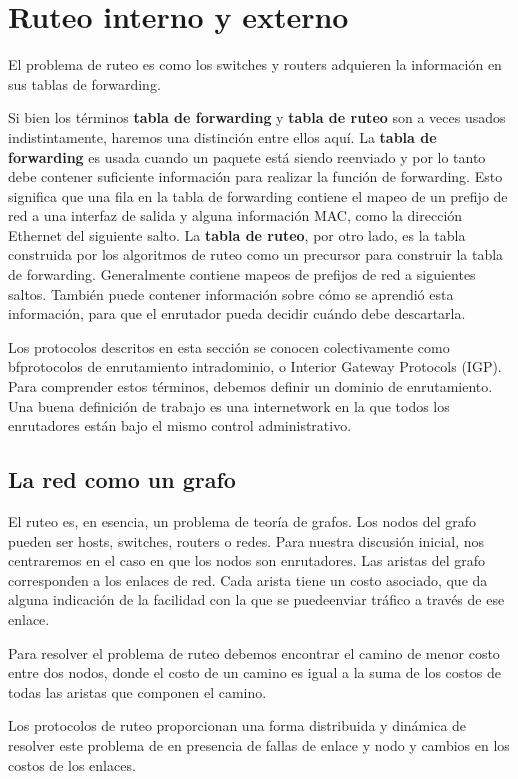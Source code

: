 \section{Ruteo interno y externo}
El problema de ruteo es como los switches y routers adquieren la información en sus tablas de forwarding.

Si bien los términos \textbf{tabla de forwarding} y \textbf{tabla de ruteo} son a veces usados indistintamente, haremos una distinción entre ellos aquí. La \textbf{tabla de forwarding} es usada cuando un paquete está siendo reenviado y por lo tanto debe contener suficiente información para realizar la función de forwarding. Esto significa que una fila en la tabla de forwarding contiene el mapeo de un prefijo de red a una interfaz de salida y alguna información MAC, como la dirección Ethernet del siguiente salto. La \textbf{tabla de ruteo}, por otro lado, es la tabla construida por los algoritmos de ruteo como un precursor para construir la tabla de forwarding. Generalmente contiene mapeos de prefijos de red a siguientes saltos. También puede contener información sobre cómo se aprendió esta información, para que el enrutador pueda decidir cuándo debe descartarla.

Los protocolos descritos en esta sección se conocen colectivamente como \text bf{protocolos de enrutamiento intradominio}, o Interior Gateway Protocols (IGP). Para comprender estos términos, debemos definir un dominio de enrutamiento. Una buena definición de trabajo es una internetwork en la que todos los enrutadores están bajo el mismo control administrativo.

\subsection{La red como un grafo}
El ruteo es, en esencia, un problema de teoría de grafos. Los nodos del grafo pueden ser hosts, switches, routers o redes. Para nuestra discusión inicial, nos centraremos en el caso en que los nodos son enrutadores. Las aristas del grafo corresponden a los enlaces de red. Cada arista tiene un costo asociado, que da alguna indicación de la facilidad con la que se puedeenviar tráfico a través de ese enlace.

Para resolver el problema de ruteo debemos encontrar el camino de menor costo entre dos nodos, donde el costo de un camino es igual a la suma de los costos de todas las aristas que componen el camino.

Los protocolos de ruteo proporcionan una forma distribuida y dinámica de resolver este problema de en presencia de fallas de enlace y nodo y cambios en los costos de los enlaces.

